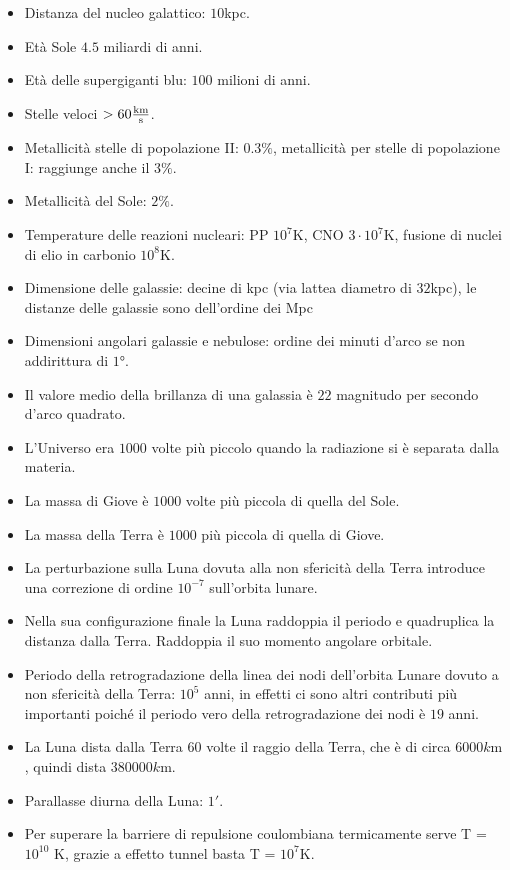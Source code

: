 \documentclass[11pt,a4paper]{article}
\begin{document}
\begin{itemize}
\item Distanza del nucleo galattico: $10$kpc.
\item Età Sole $4.5$ miliardi di anni.
\item Età delle supergiganti blu:  $100$ milioni di anni.
\item Stelle veloci $> 60 \si{\frac{\kilo \meter}{\second}}$.
\item Metallicità stelle di popolazione II: $0.3\%$, metallicità per stelle di popolazione I: raggiunge anche il $3\%$.
\item Metallicità del Sole: $2\%$.
\item Temperature delle reazioni nucleari: PP $10^7 \si{\kelvin}$, CNO $3 \cdot 10^7 \si{\kelvin}$, fusione di nuclei di elio in carbonio $10^{8} \si{\kelvin}$.
\item Dimensione delle galassie: decine di kpc (via lattea diametro di $32$kpc), le distanze delle galassie sono dell'ordine dei Mpc
\item Dimensioni angolari galassie e nebulose: ordine dei minuti d'arco se non addirittura di $1 \si{\degree}$.
\item Il valore medio della brillanza di una galassia è $22$ magnitudo per secondo d'arco quadrato.
\item L'Universo era $1000$ volte più piccolo quando la radiazione si è separata dalla materia.
\item La massa di Giove è $1000$ volte più piccola di quella del Sole.
\item La massa della Terra è $1000$ più piccola di quella di Giove.
\item La perturbazione sulla Luna dovuta alla non sfericità della Terra introduce una correzione di ordine $10^{- 7}$ sull'orbita lunare.
\item Nella sua configurazione finale la Luna raddoppia il periodo e quadruplica la distanza dalla Terra. Raddoppia il suo momento angolare orbitale.
\item Periodo della retrogradazione della linea dei nodi dell'orbita Lunare dovuto a non sfericità della Terra: $10^{5}$ anni, in effetti ci sono altri contributi più importanti poiché il periodo vero della retrogradazione dei nodi è $19$ anni.
\item La Luna dista dalla Terra $60$ volte il raggio della Terra, che è di circa $6000 \si{k\meter}$, quindi dista $380000 \si{k\meter}$.
\item Parallasse diurna della Luna: $1'$.
\item Per superare la barriere di repulsione coulombiana termicamente serve T = $10^{10}$ K, grazie a effetto tunnel basta T = $10^{7}$K.

\end{itemize}
\end{document}
